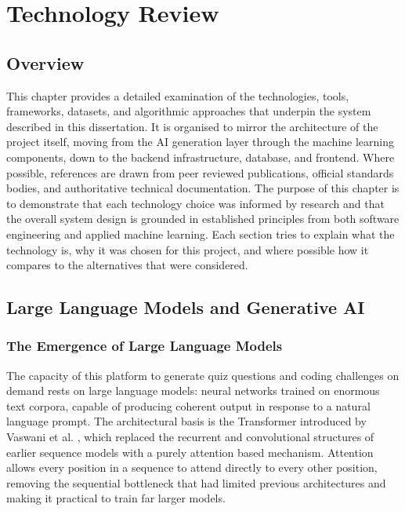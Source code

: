 \chapter{Technology Review}

\section{Overview}

This chapter provides a detailed examination of the technologies, tools,
frameworks, datasets, and algorithmic approaches that underpin the system
described in this dissertation. It is organised to mirror the architecture
of the project itself, moving from the AI generation layer through the
machine learning components, down to the backend infrastructure, database,
and frontend. Where possible, references are drawn from peer reviewed
publications, official standards bodies, and authoritative technical
documentation. The purpose of this chapter is to demonstrate that each
technology choice was informed by research and that the overall system
design is grounded in established principles from both software
engineering and applied machine learning. Each section tries to explain
what the technology is, why it was chosen for this project, and where
possible how it compares to the alternatives that were considered.

\section{Large Language Models and Generative AI}

\subsection{The Emergence of Large Language Models}

The capacity of this platform to generate quiz questions and coding
challenges on demand rests on large language models: neural networks
trained on enormous text corpora, capable of producing coherent output
in response to a natural language prompt. The architectural basis is
the Transformer introduced by Vaswani et al. \cite{vaswani2017attention},
which replaced the recurrent and convolutional structures of earlier
sequence models with a purely attention based mechanism. Attention
allows every position in a sequence to attend directly to every other
position, removing the sequential bottleneck that had limited previous
architectures and making it practical to train far larger models.

